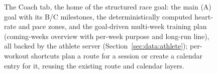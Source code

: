 \begin{figure}[ht]
\centering
{}
\caption[Coach tab]{The Coach tab, the home of the structured race goal: the main (A) goal with its B/C milestones, the deterministically computed heart-rate and pace zones, and the goal-driven multi-week training plan (coming-weeks overview with per-week purpose and long-run line), all backed by the athlete server (Section~\ref{sec:data:athlete}); per-workout shortcuts plan a route for a session or create a calendar entry for it, reusing the existing route and calendar layers.}\label{fig:screenshot_coach}
\end{figure}
